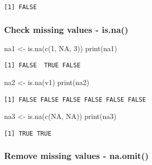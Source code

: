 \documentclass[
  letterpaper,
  DIV=11,
  numbers=noendperiod]{scrartcl}
\newenvironment{Shaded}{\begin{snugshade}}{\end{snugshade}}
\newcommand{\ConstantTok}[1]{\textcolor[rgb]{0.56,0.35,0.01}{#1}}
\newcommand{\DecValTok}[1]{\textcolor[rgb]{0.68,0.00,0.00}{#1}}
\newcommand{\FunctionTok}[1]{\textcolor[rgb]{0.28,0.35,0.67}{#1}}
\newcommand{\NormalTok}[1]{\textcolor[rgb]{0.00,0.23,0.31}{#1}}
\newcommand{\OtherTok}[1]{\textcolor[rgb]{0.00,0.23,0.31}{#1}}
\begin{document}
\begin{verbatim}
[1] FALSE
\end{verbatim}

\subsubsection{Check missing values -
is.na()}\label{check-missing-values---is.na}

\begin{Shaded}
\begin{Highlighting}[]
\NormalTok{na1 }\OtherTok{\textless{}{-}} \FunctionTok{is.na}\NormalTok{(}\FunctionTok{c}\NormalTok{(}\DecValTok{1}\NormalTok{, }\ConstantTok{NA}\NormalTok{, }\DecValTok{3}\NormalTok{))}
\FunctionTok{print}\NormalTok{(na1)}
\end{Highlighting}
\end{Shaded}

\begin{verbatim}
[1] FALSE  TRUE FALSE
\end{verbatim}

\begin{Shaded}
\begin{Highlighting}[]
\NormalTok{na2 }\OtherTok{\textless{}{-}} \FunctionTok{is.na}\NormalTok{(v1)}
\FunctionTok{print}\NormalTok{(na2)}
\end{Highlighting}
\end{Shaded}

\begin{verbatim}
[1] FALSE FALSE FALSE FALSE FALSE FALSE
\end{verbatim}

\begin{Shaded}
\begin{Highlighting}[]
\NormalTok{na3 }\OtherTok{\textless{}{-}} \FunctionTok{is.na}\NormalTok{(}\FunctionTok{c}\NormalTok{(}\ConstantTok{NA}\NormalTok{, }\ConstantTok{NA}\NormalTok{))}
\FunctionTok{print}\NormalTok{(na3)}
\end{Highlighting}
\end{Shaded}

\begin{verbatim}
[1] TRUE TRUE
\end{verbatim}

\subsubsection{Remove missing values -
na.omit()}\label{remove-missing-values---na.omit}
\end{document}
